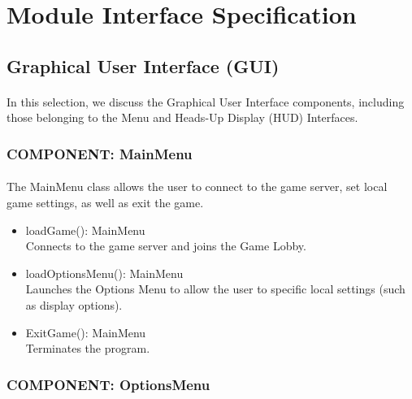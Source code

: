 \documentclass[12pt, titlepage]{article}
\begin{document}
\section{Module Interface Specification}
\subsection{Graphical User Interface (GUI)}
\paragraph{}In this selection, we discuss the Graphical User Interface components, including those belonging to the Menu and Heads-Up Display (HUD) Interfaces.
\subsubsection{COMPONENT: MainMenu}
\paragraph{}The MainMenu class allows the user to connect to the game server, set local game settings, as well as exit the game.
\begin{itemize}
    \item loadGame(): MainMenu \\ Connects to the game server and joins the Game Lobby.
    \item loadOptionsMenu(): MainMenu \\ Launches the Options Menu to allow the user to specific local settings (such as display options).
    \item ExitGame(): MainMenu \\ Terminates the program.
\end{itemize}
\subsubsection{COMPONENT: OptionsMenu}
\end{document}
